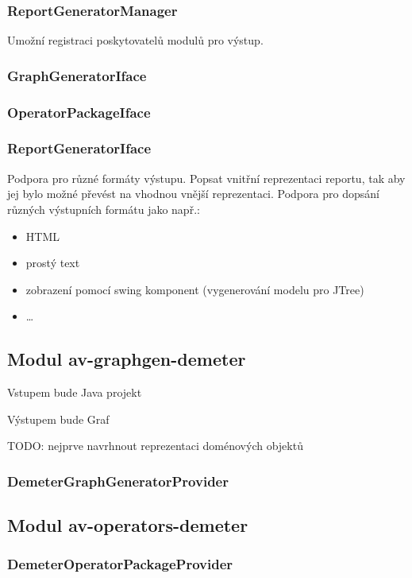 \subsubsection{ReportGeneratorManager}
Umožní registraci poskytovatelů modulů pro výstup.

\subsubsection{GraphGeneratorIface}
\subsubsection{OperatorPackageIface}
\subsubsection{ReportGeneratorIface}
Podpora pro různé formáty výstupu. Popsat vnitřní reprezentaci reportu, tak aby jej bylo možné převést na vhodnou vnější reprezentaci. Podpora pro dopsání různých výstupních formátu jako např.:
\begin{itemize}
\item HTML
\item prostý text
\item zobrazení pomocí swing komponent (vygenerování modelu pro JTree)
\item \ldots
\end{itemize}


\subsection{Modul av-graphgen-demeter}

Vstupem bude Java projekt

Výstupem bude Graf

TODO: nejprve navrhnout reprezentaci doménových objektů

\subsubsection{DemeterGraphGeneratorProvider}

\subsection{Modul av-operators-demeter}
\subsubsection{DemeterOperatorPackageProvider}


